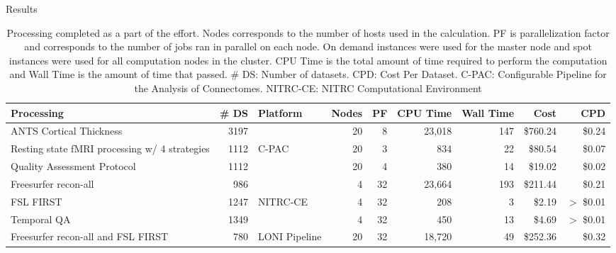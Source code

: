 \documentclass[final,hyperref={pdfpagelabels=false}]{beamer}
\begin{document}
\begin{frame}
\begin{columns}
\begin{column}{.5\textwidth}
{\begin{block}{Results}
\begin{center}
			\begin{table}
			  \caption{Processing completed as a part of the effort. Nodes corresponds to the number of hosts used in the calculation. PF is parallelization factor and corresponds to the number of jobs ran in parallel on each node. On demand instances were used for the master node and spot instances were used for all computation nodes in the cluster. CPU Time is the total amount of time required to perform the computation and Wall Time is the amount of time that passed. \# DS: Number of datasets. CPD: Cost Per Dataset. C-PAC: Configurable Pipeline for the Analysis of Connectomes. NITRC-CE: NITRC Computational Environment}
			  \begin{tabular}{lrl*{6}{r}}
				  {\bf Processing} & {\bf \# DS} & {\bf Platform} & {\bf Nodes} & {\bf PF} & {\bf CPU Time} & {\bf Wall Time} & {\bf Cost} & {\bf CPD}\\
			      \hline
				  ANTS Cortical Thickness & 3197 &  & 20 & 8 & 23,018 & 147 & \$760.24 & \$0.24\\
			 	  Resting state fMRI processing w/ 4 strategies & 1112 & C-PAC  & 20 & 3 & 834 & 22 & \$80.54 & \$0.07 \\
				  Quality Assessment Protocol & 1112 & & 20 & 4 & 380 & 14 & \$19.02 & \$0.02 \\
				  \hline
				  Freesurfer recon-all & 986 &  & 4 & 32 & 23,664 & 193 & \$211.44 & \$0.21 \\
				  FSL FIRST & 1247 & NITRC-CE & 4 & 32 & 208 & 3 & \$2.19 & $>$ \$0.01 \\
				  Temporal QA & 1349 &  & 4 & 32 & 450 & 13 & \$4.69 & $>$ \$0.01 \\
				  \hline
				  Freesurfer recon-all and FSL FIRST & 780 & LONI Pipeline & 20 & 32 & 18,720 & 49 & \$252.36 & \$0.32 \\
			 \end{tabular}
			\end{table}
			 \end{center}
              \begin{column}{.47\textwidth}


\end{column}
\end{block}}
\end{column}
\end{columns}
\end{frame}
\end{document}
